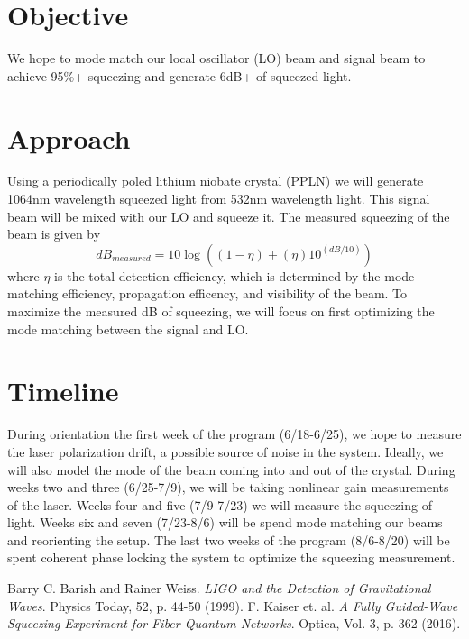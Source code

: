 \documentclass[colorlinks=true,pdfstartview=FitV,linkcolor=blue,
citecolor=red,urlcolor=magenta]{ligodoc}
\begin{document}
\section{Objective}
We hope to mode match our local oscillator (LO) beam and signal beam to achieve 95\%+ squeezing and generate 6dB+ of squeezed light.

\section{Approach}
Using a periodically poled lithium niobate crystal (PPLN) we will generate 1064nm wavelength squeezed light from 532nm wavelength light. This signal beam will be mixed with our LO and squeeze it. The measured squeezing of the beam is given by
$$dB_{measured} = 10\log((1-\eta) + (\eta)10^{(dB/10)})$$
where $\eta$ is the total detection efficiency, which is determined by the mode matching efficiency, propagation efficency, and visibility of the beam. To maximize the measured dB of squeezing, we will focus on first optimizing the mode matching between the signal and LO. 
\section{Timeline}
During orientation the first week of the program (6/18-6/25), we hope to measure the laser polarization drift, a possible source of noise in the system. Ideally, we will also model the mode of the beam coming into and out of the crystal. During weeks two and three (6/25-7/9), we will be taking nonlinear gain measurements of the laser. Weeks four and five (7/9-7/23) we will measure the squeezing of light. Weeks six and seven (7/23-8/6) will be spend mode matching our beams and reorienting the setup. The last two weeks of the program (8/6-8/20) will be spent coherent phase locking the system to optimize the squeezing measurement.

\begin{thebibliography}{9}
 Barry C. Barish and Rainer Weiss. \emph{LIGO and the Detection of Gravitational Waves}. Physics Today, 52, p. 44-50 (1999).
 F. Kaiser et. al. \emph{A Fully Guided-Wave Squeezing Experiment for Fiber Quantum Networks}. Optica, Vol. 3, p. 362 (2016).

\end{thebibliography}
\end{document}
